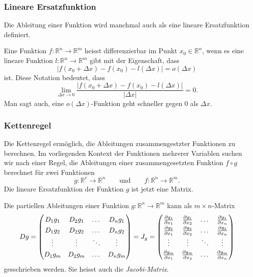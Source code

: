 %
%
\subsubsection{Lineare Ersatzfunktion}

Die Ableitung einer Funktion wird manchmal auch als eine lineare
Ersatzfunktion definiert.

\begin{definition}
Eine Funktion $f\colon\mathbb{R}^n\to\mathbb{R}^m$ heisst differenzierbar
im Punkt $x_0\in\mathbb{R}^n$, wenn es eine lineare Funktion
$l\colon \mathbb{R}^n\to\mathbb{R}^m$ gibt mit der Eigenschaft, dass
\[
|f(x_0+\Delta x) - f(x_0) - l(\Delta x)| = o(\Delta x)
\]
ist.
Diese Notation bedeutet, dass
\[
\lim_{\Delta x\to 0}
\frac{|f(x_0+\Delta x)-f(x_0)-l(\Delta x)|}{|\Delta x|}
=
0.
\]
Man sagt auch, eine $o(\Delta x)$-Funktion geht schneller gegen $0$ als
$\Delta x$.
\end{definition}

%
%
\subsubsection{Kettenregel}
Die Kettenregel ermöglich, die Ableitungen zusammengestzter Funktionen
zu berechnen.
Im vorliegenden Kontext der Funktionen mehrerer Variablen suchen
wir nach einer Regel, die Ableitungen einer zusammengesetzten Funktion
$f\circ g$ berechnet für zwei Funktionen
\[
g\colon \mathbb{R}^r\to\mathbb{R}^n
\qquad\text{und}\qquad
f\colon \mathbb{R}^n\to\mathbb{R}^m.
\]
Die lineare Ersatzfunktion der Funktion $g$ ist jetzt eine Matrix.

\begin{definition}
\label{buch:fuvar:richtungsableitung:def:ableitungsmatrix}
Die partiellen Ableitungen einer Funktion
$g\colon\mathbb{R}^n\to\mathbb{R}^m$
kann als $m\times n$-Matrix
\[
Dg
=
\begin{pmatrix}
D_1g_1 & D_2g_1 & \dots  & D_ng_1 \\
D_1g_2 & D_2g_2 & \dots  & D_ng_2 \\
\vdots & \vdots & \ddots & \vdots \\
D_1g_m & D_2g_m & \dots  & D_ng_m
\end{pmatrix}
=
J_g
=
{\renewcommand{\arraystretch}{1.3}
\begin{pmatrix}
\frac{\partial g_1}{\partial x_1}
	& \frac{\partial g_1}{\partial x_2}
		&\dots
			&\frac{\partial g_1}{\partial x_n}
\\
\frac{\partial g_2}{\partial x_1}
	& \frac{\partial g_2}{\partial x_2}
		&\dots
			&\frac{\partial g_2}{\partial x_n}
\\
\vdots	&\vdots	&\ddots	&\vdots \\
\frac{\partial g_m}{\partial x_1}
	& \frac{\partial g_m}{\partial x_2}
		&\dots
			&\frac{\partial g_m}{\partial x_n}
\end{pmatrix}}
\]
gesschrieben werden.
Sie heisst auch die {\em Jacobi-Matrix}.
%
\end{definition}

